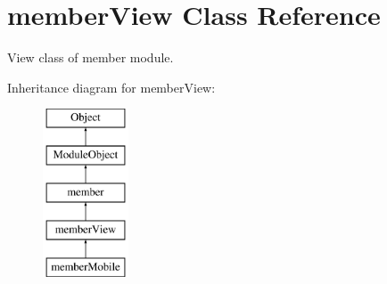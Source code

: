 \hypertarget{classmemberView}{\section{member\-View Class Reference}
\label{classmemberView}
}


View class of member module.  


Inheritance diagram for member\-View\-:\begin{figure}[H]
\begin{center}
\leavevmode
\includegraphics[height=5.000000cm]{classmemberView}
\end{center}
\end{figure}
